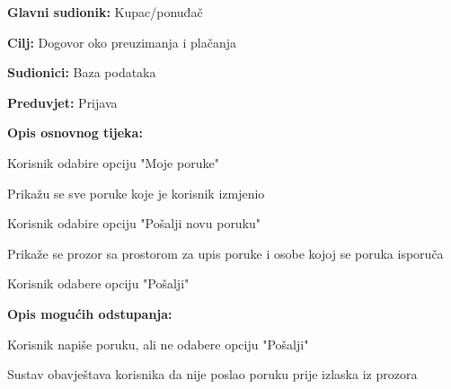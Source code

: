 					\noindent {}
					\begin{packed_item}
						
						\item \textbf{Glavni sudionik: } Kupac/ponuđač
						\item  \textbf{Cilj:} Dogovor oko preuzimanja i plačanja
						\item  \textbf{Sudionici:} Baza podataka
						\item  \textbf{Preduvjet:} Prijava 
						
						\item  \textbf{Opis osnovnog tijeka:} 
						
						\item[] \begin{packed_enum}
							
							\item Korisnik odabire opciju "Moje poruke"
							
							\item Prikažu se sve poruke koje je korisnik izmjenio
							\item Korisnik odabire opciju "Pošalji novu poruku"
							\item Prikaže se prozor sa prostorom za upis poruke i osobe kojoj se poruka isporuča
							
							\item Korisnik odabere opciju "Pošalji"
							
							
						\end{packed_enum}
						
						\item  \textbf{Opis mogućih odstupanja:}
						
						\item[] \begin{packed_item}
							
							\item[2.a] Korisnik napiše poruku, ali ne odabere opciju "Pošalji"
							\item[] \begin{packed_enum}
								
								\item Sustav obavještava korisnika da nije poslao poruku prije izlaska iz prozora
								
							\end{packed_enum}
							
							
						\end{packed_item}
					\end{packed_item}
					
